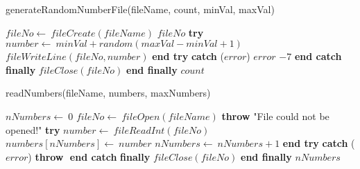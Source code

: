 \documentclass[a4paper,10pt]{article}
\begin{document}
\begin{algorithm}
\caption{generateRandomNumberFile(fileName, count, minVal, maxVal)}
\begin{algorithmic}[5]

\STATE {}
\STATE {}
\STATE {}
\STATE {}
  \STATE \(fileNo\gets\ fileCreate(fileName)\)
    \RETURN\(fileNo\)
  \ENDIF
  \STATE \textbf{try}  \BODY
      \STATE \(number\gets\ minVal+random(maxVal-minVal+1)\)
      \STATE \(fileWriteLine(fileNo,number)\)
    \ENDFOR
  \ENDBODY \STATE \textbf{end try}
  \STATE \textbf{catch} (\(error\)) \BODY
    \PRINT\(error\)
    \RETURN\(-7\)
  \ENDBODY \STATE \textbf{end catch}
  \STATE \textbf{finally} \BODY
    \STATE \(fileClose(fileNo)\)
  \ENDBODY \STATE \textbf{end finally}
  \RETURN\(count\)

\end{algorithmic}
\end{algorithm}


\begin{algorithm}
\caption{readNumbers(fileName, numbers, maxNumbers)}
\begin{algorithmic}[5]

\STATE {}
\STATE {}
\STATE {}
  \STATE \(nNumbers\gets\ 0\)
  \STATE \(fileNo\gets\ fileOpen(fileName)\)
    \STATE \textbf{throw} \(\)"{}File could not be opened!"{}\(\)
  \ENDIF
  \STATE \textbf{try}  \BODY
      \STATE \(number\gets\ fileReadInt(fileNo)\)
      \STATE \(numbers[nNumbers]\gets\ number\)
      \STATE \(nNumbers\gets\ nNumbers+1\)
    \ENDWHILE
  \ENDBODY \STATE \textbf{end try}
  \STATE \textbf{catch} (\(error\)) \BODY
    \STATE \textbf{throw} \(\)
  \ENDBODY \STATE \textbf{end catch}
  \STATE \textbf{finally} \BODY
    \STATE \(fileClose(fileNo)\)
  \ENDBODY \STATE \textbf{end finally}
  \RETURN\(nNumbers\)

\end{algorithmic}
\end{algorithm}
\end{document}

